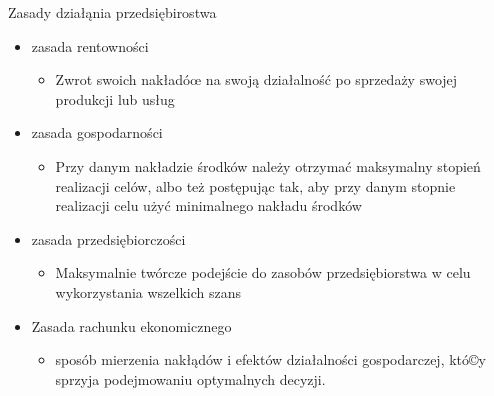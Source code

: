 \documentclass[a4paper,10pt]{report}
\begin{document}
\noindent Zasady działąnia przedsiębirostwa
\begin{itemize}
	\item zasada rentowności
	\begin{itemize}
		\item Zwrot swoich nakładóœ na swoją działalność po sprzedaży swojej produkcji lub usług
	\end{itemize}
	\item zasada gospodarności
	\begin{itemize}
		\item Przy danym nakładzie środków należy otrzymać maksymalny stopień realizacji celów, albo też postępując tak, aby przy danym stopnie realizacji celu użyć minimalnego nakładu środków
	\end{itemize}
	\item zasada przedsiębiorczości
	\begin{itemize}
		\item Maksymalnie twórcze podejście do zasobów przedsiębiorstwa w celu wykorzystania wszelkich szans
	\end{itemize}
	\item Zasada rachunku ekonomicznego
	\begin{itemize}
		\item sposób mierzenia nakłądów i efektów działalności gospodarczej, któ©y sprzyja podejmowaniu optymalnych decyzji.
	\end{itemize}
\end{itemize}
\end{document}
